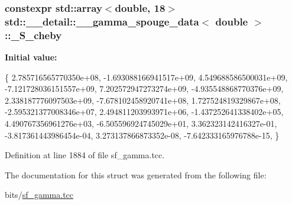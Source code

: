 \subsubsection[{\texorpdfstring{\+\_\+\+S\+\_\+cheby}{_S_cheby}}]{\setlength{\rightskip}{0pt plus 5cm}constexpr std\+::array$<$double, 18$>$ {\bf std\+::\+\_\+\+\_\+detail\+::\+\_\+\+\_\+gamma\+\_\+spouge\+\_\+data}$<$ double $>$\+::\+\_\+\+S\+\_\+cheby\hspace{0.3cm}{\ttfamily [static]}}\hypertarget{structstd_1_1____detail_1_1____gamma__spouge__data_3_01double_01_4_ae7638accff257079573b702a72e01254}{}\label{structstd_1_1____detail_1_1____gamma__spouge__data_3_01double_01_4_ae7638accff257079573b702a72e01254}
{\bfseries Initial value\+:}
\begin{DoxyCode}
\{
     2.785716565770350e+08,
    -1.693088166941517e+09,
     4.549688586500031e+09,
    -7.121728036151557e+09,
     7.202572947273274e+09,
    -4.935548868770376e+09,
     2.338187776097503e+09,
    -7.678102458920741e+08,
     1.727524819329867e+08,
    -2.595321377008346e+07,
     2.494811203993971e+06,
    -1.437252641338402e+05,
     4.490767356961276e+03,
    -6.505596924745029e+01,
     3.362323142416327e-01,
    -3.817361443986454e-04,
     3.273137866873352e-08,
    -7.642333165976788e-15,
      \}
\end{DoxyCode}


Definition at line 1884 of file sf\+\_\+gamma.\+tcc.



The documentation for this struct was generated from the following file\+:\begin{DoxyCompactItemize}
\item 
bits/\hyperlink{sf__gamma_8tcc}{sf\+\_\+gamma.\+tcc}\end{DoxyCompactItemize}
